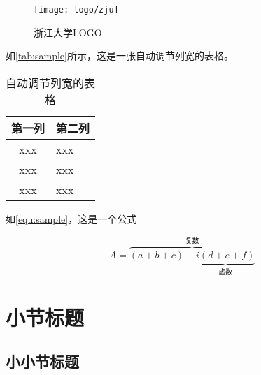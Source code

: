 \begin{figure}[ht]
    \centering
    \texttt{[image: logo/zju]}
    \caption{\label{fig:zju-logo}浙江大学LOGO}
\end{figure}

\par 如\autoref{tab:sample}所示，这是一张自动调节列宽的表格。

\begin{table}[ht]
    \caption{\label{tab:sample}自动调节列宽的表格}
    \begin{tabularx}{\linewidth}{c|X<{\centering}}
        \hline
        第一列 & 第二列 \\ \hline
        xxx & xxx \\ \hline
        xxx & xxx \\ \hline
        xxx & xxx \\ \hline
    \end{tabularx}
\end{table}

\par 如\autoref{equ:sample}，这是一个公式

\begin{equation}
    \label{equ:sample}
    A=\overbrace{(a+b+c)+\underbrace{i(d+e+f)}_{\text{虚数}}}^{\text{复数}}
\end{equation}


\section{小节标题}

\subsection{小小节标题}